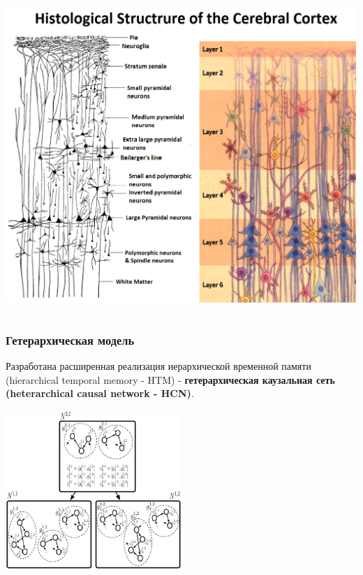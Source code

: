 \documentclass[default]{beamer}
\begin{document}
\begin{frame}
\begin{columns}
\begin{column}{0.65\textwidth}
				\includegraphics[width=\textwidth]{phisio/cortex_layers}
			\end{column}
		\end{columns}
		\nocite{*}
		\printbibliography[keyword={column}, resetnumbers=true]
	\end{frame}
	
	\begin{frame}
		\frametitle{Гетерархическая модель}
		
		Разработана расширенная реализация иерархической временной памяти (hierarchical temporal memory - HTM) - \textbf{гетерархическая каузальная сеть (heterarchical causal network - HCN)}.
		
		\begin{center}
			\includegraphics[width=0.5\textwidth]{mpf/hawkins_htm}
		\end{center}

	\end{frame}
\end{document}

